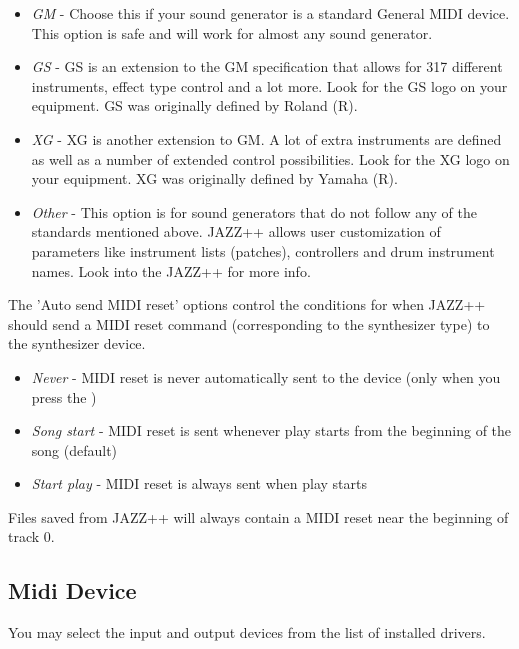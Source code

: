 \documentclass[letterpaper]{report}
\begin{document}
\begin{itemize}

\item{\em GM}
- Choose this if your sound generator is a standard General MIDI device.
This option is safe and will work for almost any sound generator.

\item{\em GS}
- GS is an extension to the GM specification that allows for 317 different
instruments, effect type control and a lot more. Look for the GS logo on
your equipment. GS was originally defined by Roland (R).

\item{\em XG}
- XG is another extension to GM. A lot of extra instruments
are defined as well as a number of extended control possibilities. Look
for the XG logo on your equipment. XG was originally defined by
Yamaha (R).

\item{\em Other}
- This option is for sound generators that do not follow any of the standards
mentioned above. JAZZ++ allows user customization of parameters like
instrument lists (patches), controllers and drum instrument names. Look
into the JAZZ++  for more info.

\end{itemize}

The 'Auto send MIDI reset' options control the conditions for when JAZZ++
should send a MIDI reset command (corresponding to the synthesizer type) to the
synthesizer device.

\begin{itemize}
\item {\em Never} - MIDI reset is never automatically sent to the device
(only when you press the )
\item {\em Song start} - MIDI reset is sent whenever play starts from the
beginning of the song (default)
\item {\em Start play} - MIDI reset is always sent when play starts
\end{itemize}

Files saved from JAZZ++ will always contain a MIDI reset near the beginning
of track 0.

\subsection{Midi Device}

You may select the input and output devices from the list of installed
drivers.
\end{document}
